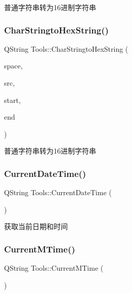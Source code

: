 普通字符串转为16进制字符串 

\mbox{\label{class_tools_ae4c5caed900acc0c2ca436929a753dff}} 
\subsubsection{\texorpdfstring{CharStringtoHexString()}{CharStringtoHexString()}\hspace{0.1cm}{\footnotesize\ttfamily [2/2]}}
{\footnotesize\ttfamily Q\+String Tools\+::\+Char\+Stringto\+Hex\+String (\begin{DoxyParamCaption}\item[{Q\+String}]{space,  }\item[{const char $\ast$}]{src,  }\item[{int}]{start,  }\item[{int}]{end }\end{DoxyParamCaption})}



普通字符串转为16进制字符串 

\mbox{\label{class_tools_a438ea9326a6ae735d51bc3508c430a3b}} 
\subsubsection{\texorpdfstring{CurrentDateTime()}{CurrentDateTime()}}
{\footnotesize\ttfamily Q\+String Tools\+::\+Current\+Date\+Time (\begin{DoxyParamCaption}{ }\end{DoxyParamCaption})}



获取当前日期和时间 

\mbox{\label{class_tools_a70173de28152ff05b140b9895de99e20}} 
\subsubsection{\texorpdfstring{CurrentMTime()}{CurrentMTime()}}
{\footnotesize\ttfamily Q\+String Tools\+::\+Current\+M\+Time (\begin{DoxyParamCaption}{ }\end{DoxyParamCaption})}



